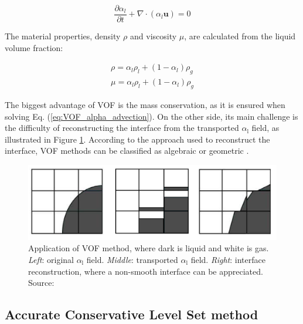 \begin{equation}
	\label{eq:VOF_alpha_advection}
	\frac{\partial \alpha_l}{\partial t} + \nabla \cdot \left( \alpha_l \boldsymbol{u} \right) = 0
\end{equation}

The material properties, density $\rho$ and viscosity $\mu$, are calculated from the liquid volume fraction:

\begin{subequations}
\begin{align}
\rho = \alpha_l \rho_l + \left( 1 - \alpha_l \right) \rho_g  \\
\mu = \alpha_l \rho_l + \left( 1 - \alpha_l \right) \rho_g
\end{align}
\end{subequations}


The biggest advantage of VOF is the mass conservation, as it is ensured when solving Eq. (\ref{eq:VOF_alpha_advection}). On the other side, its main challenge is the difficulty of reconstructing the interface from the transported $\alpha_\mathrm{l}$ field, as illustrated in Figure \ref{fig:VOF_illustration_drawback}. According to the approach used to reconstruct the interface, VOF methods can be classified as algebraic or geometric .


\begin{figure}[h!]
	\centering
	\includegraphics[scale=0.5]{./part1_numerical_approaches/figures_ch2/VOF}
	\caption[Application of VOF method]{Application of VOF method, where dark is liquid and white is gas. \textsl{Left}: original $\alpha_\mathrm{l}$ field. \textsl{Middle}: transported $\alpha_\mathrm{l}$ field. \textsl{Right}: interface reconstruction, where a non-smooth interface can be appreciated. Source: }
	\label{fig:VOF_illustration_drawback}
\end{figure}


\subsection{Accurate Conservative Level Set method}
\label{subsec:ch2_ACLS}

